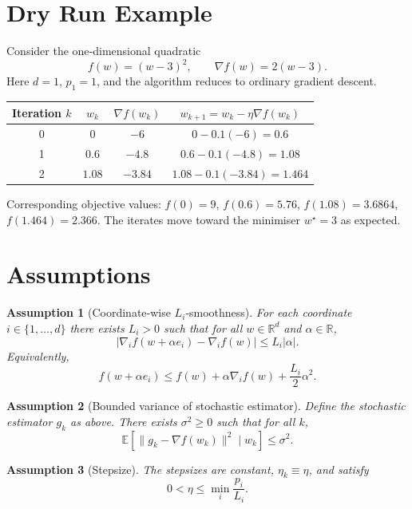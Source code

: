 \documentclass{article}
\newtheorem{assumption}{Assumption}
\begin{document}
\section*{Dry Run Example}
Consider the one‑dimensional quadratic
\[
    f(w)=(w-3)^2,\qquad \nabla f(w)=2(w-3).
\]
Here $d=1$, $p_1=1$, and the algorithm reduces to ordinary gradient descent.

\begin{center}
\begin{tabular}{c|c|c|c}
Iteration $k$ & $w_k$ & $\nabla f(w_k)$ & $w_{k+1}=w_k-\eta \nabla f(w_k)$\\ \hline
0 & $0$ & $-6$ & $0-0.1(-6)=0.6$\\
1 & $0.6$ & $-4.8$ & $0.6-0.1(-4.8)=1.08$\\
2 & $1.08$ & $-3.84$ & $1.08-0.1(-3.84)=1.464$\\
\end{tabular}
\end{center}
Corresponding objective values:
$f(0)=9$, $f(0.6)=5.76$, $f(1.08)=3.6864$, $f(1.464)=2.366$.
The iterates move toward the minimiser $w^\star=3$ as expected.

\newpage

\section*{Assumptions}
\begin{assumption}[Coordinate‑wise $L_i$‑smoothness]\label{as:smooth}
For each coordinate $i\in\{1,\dots ,d\}$ there exists $L_i>0$ such that for all $w\in\mathbb{R}^d$ and $\alpha\in\mathbb{R}$,
\[
    \bigl|\nabla_i f(w+\alpha e_i)-\nabla_i f(w)\bigr|\le L_i|\alpha|.
\]
Equivalently,
\[
    f(w+\alpha e_i)\le f(w)+\alpha \nabla_i f(w)+\frac{L_i}{2}\alpha^2 .
\]
\end{assumption}

\begin{assumption}[Bounded variance of stochastic estimator]\label{as:variance}
Define the stochastic estimator $g_k$ as above. There exists $\sigma^2\ge0$ such that for all $k$,
\[
    \mathbb{E}\!\left[\bigl\|g_k-\nabla f(w_k)\bigr\|^2\mid w_k\right]\le\sigma^2 .
\]
\end{assumption}

\begin{assumption}[Stepsize]\label{as:stepsize}
The stepsizes are constant, $\eta_k\equiv\eta$, and satisfy
\[
    0<\eta\le \min_{i}\frac{p_i}{L_i}.
\]
\end{assumption}
\end{document}
